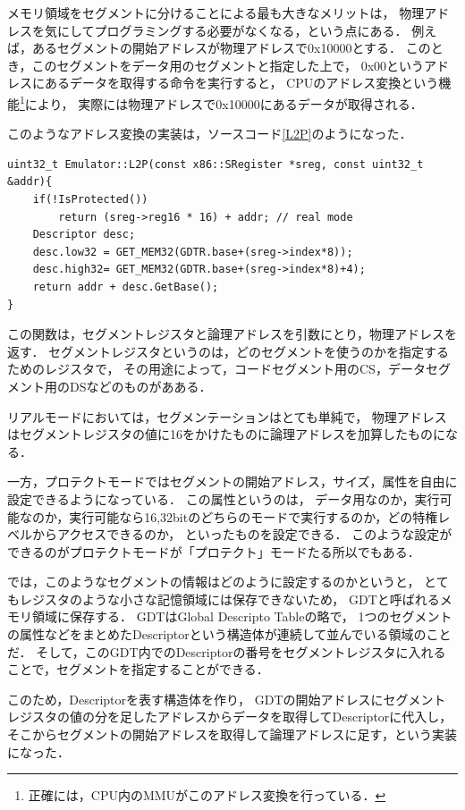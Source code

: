 \documentclass[10pt,a4j]{jsarticle}
\begin{document}
メモリ領域をセグメントに分けることによる最も大きなメリットは，
物理アドレスを気にしてプログラミングする必要がなくなる，という点にある．
例えば，あるセグメントの開始アドレスが物理アドレスで0x10000とする．
このとき，このセグメントをデータ用のセグメントと指定した上で，
0x00というアドレスにあるデータを取得する命令を実行すると，
CPUのアドレス変換という機能\footnote{正確には，CPU内のMMUがこのアドレス変換を行っている．}により，
実際には物理アドレスで0x10000にあるデータが取得される．

このようなアドレス変換の実装は，ソースコード\ref{L2P}のようになった．
\begin{lstlisting}[caption=論理アドレスの物理アドレスへの変換,label=L2P]
uint32_t Emulator::L2P(const x86::SRegister *sreg, const uint32_t &addr){
	if(!IsProtected())
		return (sreg->reg16 * 16) + addr; // real mode
	Descriptor desc;
	desc.low32 = GET_MEM32(GDTR.base+(sreg->index*8));
	desc.high32= GET_MEM32(GDTR.base+(sreg->index*8)+4);
	return addr + desc.GetBase();
}
\end{lstlisting}
この関数は，セグメントレジスタと論理アドレスを引数にとり，物理アドレスを返す．
セグメントレジスタというのは，どのセグメントを使うのかを指定するためのレジスタで，
その用途によって，コードセグメント用のCS，データセグメント用のDSなどのものがあある．

リアルモードにおいては，セグメンテーションはとても単純で，
物理アドレスはセグメントレジスタの値に16をかけたものに論理アドレスを加算したものになる．

一方，プロテクトモードではセグメントの開始アドレス，サイズ，属性を自由に設定できるようになっている．
この属性というのは，
データ用なのか，実行可能なのか，実行可能なら16,32bitのどちらのモードで実行するのか，どの特権レベルからアクセスできるのか，
といったものを設定できる．
このような設定ができるのがプロテクトモードが「プロテクト」モードたる所以でもある．

では，このようなセグメントの情報はどのように設定するのかというと，
とてもレジスタのような小さな記憶領域には保存できないため，
GDTと呼ばれるメモリ領域に保存する．
GDTはGlobal Descripto Tableの略で，
1つのセグメントの属性などをまとめたDescriptorという構造体が連続して並んでいる領域のことだ．
そして，このGDT内でのDescriptorの番号をセグメントレジスタに入れることで，セグメントを指定することができる．

このため，Descriptorを表す構造体を作り，
GDTの開始アドレスにセグメントレジスタの値の分を足したアドレスからデータを取得してDescriptorに代入し，
そこからセグメントの開始アドレスを取得して論理アドレスに足す，という実装になった．
\end{document}
